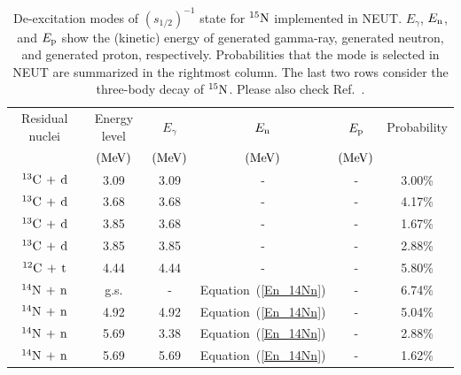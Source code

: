 \begin{table}[h]
	\centering
	\caption[De-excitation modes of $(s_{1/2})^{-1}$ state for $^{15}{\rm N}$ implemented in NEUT]{
	De-excitation modes of $(s_{1/2})^{-1}$ state for $^{15}{\rm N}$ implemented in NEUT.
	$E_{\gamma}$, $E_{{\rm n}}$, and $E_{{\rm p}}$ show the (kinetic) energy of generated gamma-ray, generated neutron, and generated proton, respectively.
	Probabilities that the mode is selected in NEUT are summarized in the rightmost column.
	The last two rows consider the three-body decay of $^{15}{\rm N}$.
	Please also check Ref.~\cite{2006Kobayashi}.
	}\label{deex_s1_2_N}
	\vs
	\begin{tabular}{cccccc} \hline \hline
		Residual nuclei            & Energy level  & $E_{\gamma}$  & $E_{{\rm n}}$            & $E_{{\rm p}}$            & Probability \\
		                           & $({\rm MeV})$ & $({\rm MeV})$ & $({\rm MeV})$            & $({\rm MeV})$            &             \\ \hline
		$^{13}{\rm C}\,+\,{\rm d}$ & 3.09          & 3.09          & -                        & -                        & 3.00\%      \\
		$^{13}{\rm C}\,+\,{\rm d}$ & 3.68          & 3.68          & -                        & -                        & 4.17\%      \\
		$^{13}{\rm C}\,+\,{\rm d}$ & 3.85          & 3.68          & -                        & -                        & 1.67\%      \\
		$^{13}{\rm C}\,+\,{\rm d}$ & 3.85          & 3.85          & -                        & -                        & 2.88\%      \\
		$^{12}{\rm C}\,+\,{\rm t}$ & 4.44          & 4.44          & -                        & -                        & 5.80\%      \\
		$^{14}{\rm N}\,+\,{\rm n}$ & g.s.          & -             & Equation~(\ref{En_14Nn}) & -                        & 6.74\%      \\
		$^{14}{\rm N}\,+\,{\rm n}$ & 4.92          & 4.92          & Equation~(\ref{En_14Nn}) & -                        & 5.04\%      \\
		$^{14}{\rm N}\,+\,{\rm n}$ & 5.69          & 3.38          & Equation~(\ref{En_14Nn}) & -                        & 2.88\%      \\
		$^{14}{\rm N}\,+\,{\rm n}$ & 5.69          & 5.69          & Equation~(\ref{En_14Nn}) & -                        & 1.62\%      \\

\end{tabular}
\end{table}
